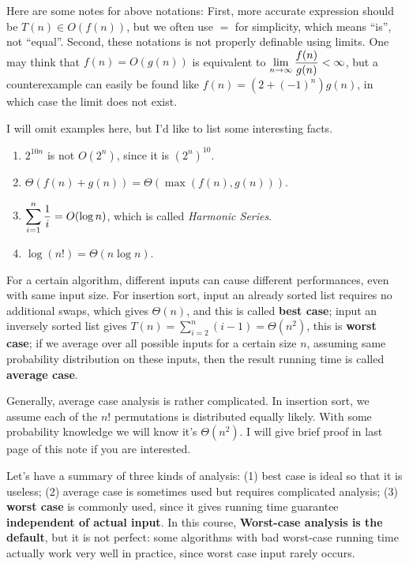 \begin{spacing}{1.3}
    Here are some notes for above notations: 
    First, more accurate expression should be $T(n)\in O(f(n))$,
    but we often use $=$ for simplicity, which means ``is'', not ``equal''.
    Second, these notations is not properly definable using limits.
    One may think that $f(n)=O(g(n))$ is equivalent to 
    $\displaystyle \lim_{n\rightarrow \infty} \frac{f(n)}{g(n)}<\infty$, 
    but a counterexample can easily be found like 
    $f(n)=(2+(-1)^{n})g(n)$, in which case the limit does not exist.

    I will omit examples here, but I'd like to list some interesting facts.
    \begin{enumerate}
        \item $2^{10n}$ is not $O(2^n)$, since it is $(2^n)^{10}$. 
        \item $\Theta (f(n)+g(n))=\Theta(\max(f(n), g(n)))$.
        \item $\displaystyle \sum_{i=1}^{n}\frac{1}{i}=O(\log n)$, which is 
        called {\it Harmonic Series}.
        \item $\log(n!)=\Theta (n\log n)$.
    \end{enumerate}

    For a certain algorithm, different inputs can cause different
    performances, even with same input size.
    For insertion sort, input an already sorted list requires
    no additional swaps, which gives $\Theta(n)$, and this is 
    called {\bf best case}; input an inversely sorted list
    gives $T(n)=\sum_{i=2}^{n}(i-1)=\Theta(n^2)$, this is 
    {\bf worst case}; if we average over all possible inputs
    for a certain size $n$, assuming same probability distribution
    on these inputs, then the result running time is called 
    {\bf average case}.

    Generally, average case analysis is rather complicated.
    In insertion sort, we assume each of the $n!$ permutations
    is distributed equally likely. With some probability 
    knowledge we will know it's $\Theta(n^2)$. I will 
    give brief proof in last page of this note if you are interested.

    Let's have a summary of three kinds of analysis: 
    (1) best case is ideal so that it is useless;
    (2) average case is sometimes used but requires
    complicated analysis; 
    (3) {\bf worst case} is commonly used, since it gives 
    running time guarantee {\bf independent of actual input}.
    In this course, {\bf Worst-case analysis is the default},
    but it is not perfect: some algorithms with bad worst-case 
    running time actually work very well in practice, 
    since worst case input rarely occurs.


\end{spacing}
